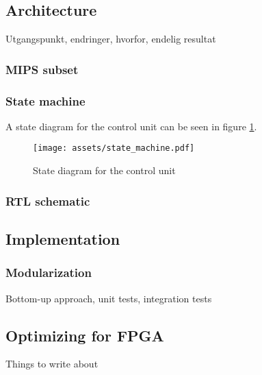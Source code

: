 \subsection{Architecture}

Utgangspunkt, endringer, hvorfor, endelig resultat

\subsubsection{MIPS subset}

\subsubsection{State machine}

A state diagram for the control unit can be seen in figure \ref{fig:state_machine}.

\begin{figure}[ht!]
    \begin{center}
    \texttt{[image: assets/state\_machine.pdf]}
    \caption{State diagram for the control unit}
    \label{fig:state_machine}
    \end{center}
\end{figure}

\subsubsection{RTL schematic}

\subsection{Implementation}

\subsubsection{Modularization}

Bottom-up approach, unit tests, integration tests

\subsection{Optimizing for FPGA}


Things to write about

